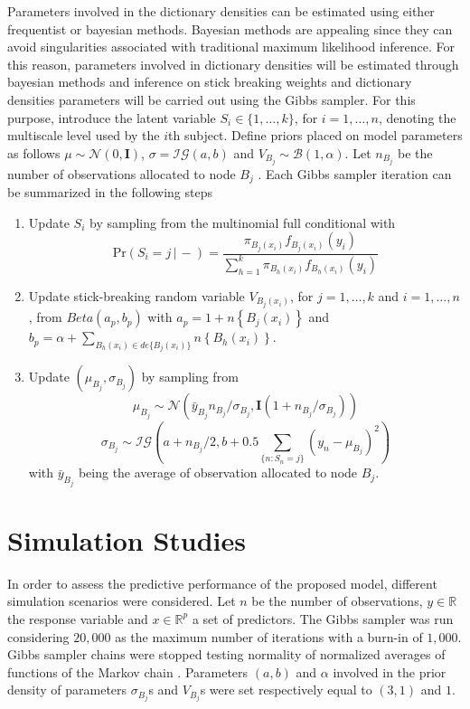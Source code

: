 \documentclass{article}
\newcommand{\Real}{\mathbb{R}}
\providecommand{\mb}[1]{\boldsymbol{#1}}
\providecommand{\mc}[1]{\mathcal{#1}}
\begin{document}
Parameters involved in the dictionary densities can be estimated using either frequentist or bayesian methods. Bayesian methods are appealing since they can avoid singularities associated with traditional maximum likelihood inference. For this reason, parameters involved in dictionary densities will be estimated through bayesian methods and inference on stick breaking weights and dictionary densities parameters will be carried out using the Gibbs sampler. For this purpose, introduce the latent variable $S_i \in \{1,\ldots,k\}$, for $i=1,\ldots,n$, denoting the multiscale level used by the $i$th subject. Define priors placed on model parameters as follows $\mu \sim \mc{N}(0,\mb{I})$, $\sigma=\mc{IG}(a,b)$ and $V_{B_j} \sim \mc{B}(1,\alpha)$. Let $n_{B_j}$ be  the number of observations allocated to node $B_j$ . Each Gibbs sampler iteration can be summarized in the following steps
\begin{enumerate}
\item Update $S_i$ by sampling from the multinomial full conditional with 
\[\mbox{Pr}( S_i = j\, |\, -) = \frac{ \pi_{B_j(x_i)}f_{B_j(x_i)}(y_i) }{ \sum_{h=1}^k \pi_{B_h(x_i)}f_{B_h(x_i)}(y_i) } \label{eq:prS}\]
\item Update stick-breaking random variable $V_{B_j(x_i)}$, for $j=1, \ldots, k$ and $i=1, \ldots, n$, from $Beta(a_p,b_p)$ with $a_p=1+n\left\{B_j(x_i)\right\}$ and $b_p=\alpha+\sum_{B_h(x_i) \in de\{B_j(x_i)\}} n\left\{B_h(x_i)\right\}$.
\item Update $(\mu_{B_j},\sigma_{B_j})$ by sampling from
\[  \mu_{B_j} \sim \mc{N}\left(\bar{y}_{B_j} n_{B_j}/\sigma_{B_j},\mb{I}(1+n_{B_j}/\sigma_{B_j})\right)\]
\[  \sigma_{B_j} \sim \mc{IG}\left(a+n_{B_j}/2,b+0.5\sum_{\{n: S_n=j\}} \left(y_{n}-\mu_{B_j}\right)^2\right)\]
with $\bar{y}_{B_j}$ being the average of observation allocated to node $B_j$.

\end{enumerate}



\section{Simulation Studies}
In order to assess the predictive performance of the proposed model, different simulation scenarios were considered. Let $n$ be the number of observations, $y \in \Real$ the response variable and $x \in \Real^p$ a set of predictors. The Gibbs sampler was run considering $20,000$ as the maximum number of iterations with a burn-in of $1,000$. Gibbs sampler chains were stopped testing normality of normalized averages of functions of the Markov chain \cite{Chauveau98anautomated}. Parameters $(a,b)$ and $\alpha$ involved in the prior density of parameters $\sigma_{B_j}$s and $V_{B_j}$s were set respectively equal to $(3,1)$ and $1$.
\end{document}
